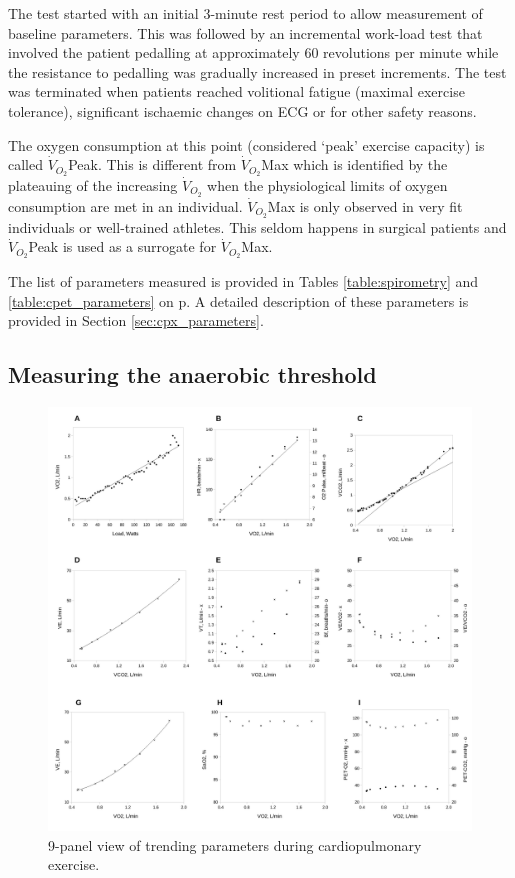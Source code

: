 The test started with an initial 3-minute rest period to allow measurement of baseline parameters. 
This was followed by an incremental work-load test that involved the patient pedalling at approximately 60 revolutions per minute while the resistance to pedalling was gradually increased in preset increments. 
The test was terminated when patients reached volitional fatigue (maximal exercise tolerance), significant ischaemic changes on ECG or for other safety reasons. 

The oxygen consumption at this point (considered `peak' exercise capacity) is called $\dot{V}_{O_2}$Peak.
This is different from $\dot{V}_{O_2}$Max which is identified by the plateauing of the increasing $\dot{V}_{O_2}$ when the physiological limits of oxygen consumption are met in an individual.
$\dot{V}_{O_2}$Max is only observed in very fit individuals or well-trained athletes.
This seldom happens in surgical patients and $\dot{V}_{O_2}$Peak is used as a surrogate for $\dot{V}_{O_2}$Max.

The list of parameters measured is provided in Tables \ref{table:spirometry} and \ref{table:cpet_parameters} on p\pageref{table:spirometry}.
A detailed description of these parameters is provided in Section \ref{sec:cpx_parameters}.

\subsection{Measuring the anaerobic threshold}
\label{sec:cpx_at_method}

\begin{figure}[htbp]
	\centering
	\includegraphics[width=\textwidth]{Figures/cpet_9panel.pdf}
	\caption{9-panel view of trending parameters during cardiopulmonary exercise.}
	\label{fig:cpet_9panel}
\end{figure}

